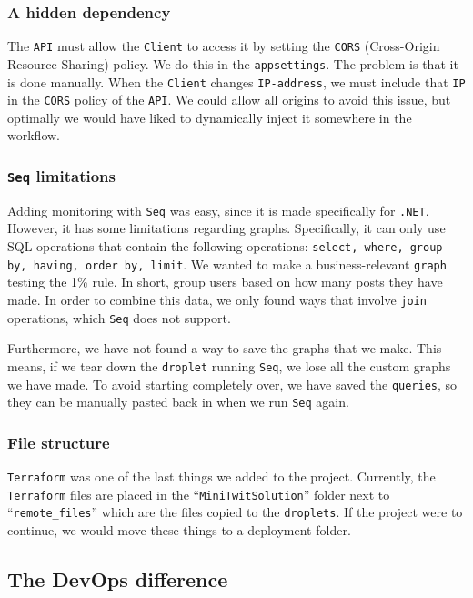 \subsubsection{A hidden dependency}

The \texttt{API} must allow the \texttt{Client} to access it by 
setting the \texttt{CORS} (Cross-Origin Resource Sharing) policy.
We do this in the \texttt{appsettings}. The problem is that it is done manually.
When the \texttt{Client} changes \texttt{IP-address}, we must include 
that \texttt{IP} in the \texttt{CORS} policy of the \texttt{API}.
We could allow all origins to avoid this issue, 
but optimally we would have liked to dynamically 
inject it somewhere in the workflow.

\subsubsection{\texttt{Seq} limitations}

Adding monitoring with \texttt{Seq} was easy, since it is made specifically for \texttt{.NET}.
However, it has some limitations regarding graphs.
Specifically, it can only use SQL operations that contain the following operations:
\texttt{select, where, group by, having, order by, limit}.
We wanted to make a business-relevant \texttt{graph} testing the 1\% rule\cite{1_perc_rule}.
In short, group users based on how many posts they have made.
In order to combine this data, we only found ways that involve 
\texttt{join} operations, which \texttt{Seq} does not support.

Furthermore, we have not found a way to save the graphs that we make.
This means, if we tear down the \texttt{droplet} running \texttt{Seq},
we lose all the custom graphs we have made.
To avoid starting completely over, we have saved the \texttt{queries},
so they can be manually pasted back in when we run \texttt{Seq} again.

\subsubsection{File structure}

\texttt{Terraform} was one of the last things we added to the project.
Currently, the \texttt{Terraform} files are placed in the ``\texttt{MiniTwitSolution}'' 
folder next to ``\texttt{remote\_files}'' which are the files copied to the \texttt{droplets}.
If the project were to continue, we would move these things to a deployment folder.

\subsection{The DevOps difference}

